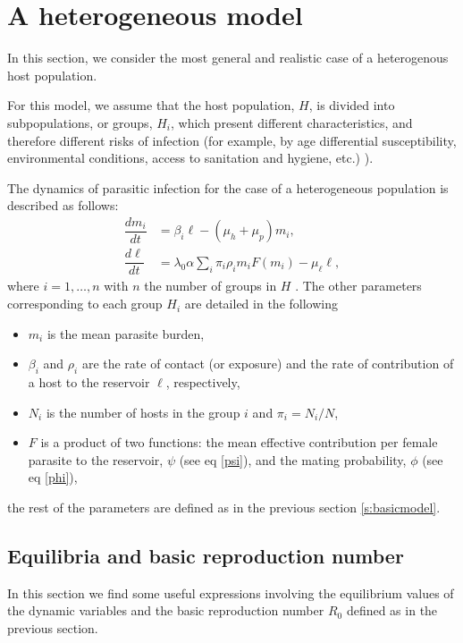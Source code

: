 \documentclass[eng]{MMSB-class-eng}
\begin{document}
\section{A heterogeneous model}
{\color{red}
In this section, we consider the most general and realistic case of a heterogenous host population. 

For this model, we assume that the host population, $H$, is divided into subpopulations, or groups, $H_i$, which present different characteristics, and therefore different risks of infection (for example, by age differential susceptibility, environmental conditions, access to sanitation and hygiene, etc.) \cite{anderson1992infectious,anderson2014coverage,brooker2006contrasting,freeman2015associations,truscott2014modeling}).


The dynamics of parasitic infection for the case of a heterogeneous population is described as follows:
\begin{equation}\label{model2}
\begin{split}
\dfrac{dm_i}{dt}&=\beta_i \ell - (\mu_h+\mu_p) m_i,\\
\dfrac{d\ell}{dt}&= 
\lambda_0 \alpha
\sum_i  \pi_i \rho_i  m_i F(m_i)   - \mu_{\ell} \ell ,
\end{split}
\end{equation} 
where $i=1,\ldots,n$ with $n$ the number of groups in $H$ .     
The other parameters corresponding to each group $H_i$ are detailed in the following

\begin{itemize}
	\item $m_i$ is the mean parasite burden,
	\item $\beta_i$ and $\rho_i$  are the rate of contact (or exposure) and the rate of contribution
	of a host to the reservoir $\ell$, respectively,
	\item $N_{i}$ is the number of hosts in the group $i$ and $\pi_i=N_i/N$,
	\item $F$ is a product of two functions: the mean effective contribution per female parasite to the reservoir, $\psi$ (see eq \eqref{psi}), and the mating probability, $\phi$ (see eq \eqref{phi}),  
\end{itemize}
the rest of the parameters are defined as in the previous section \ref{s:basicmodel}.
}

\subsection{Equilibria and basic reproduction number}
In this section we find some useful expressions involving the equilibrium values of the dynamic variables and the basic reproduction number $R_0$ defined as in the previous section.
 
\end{document}
